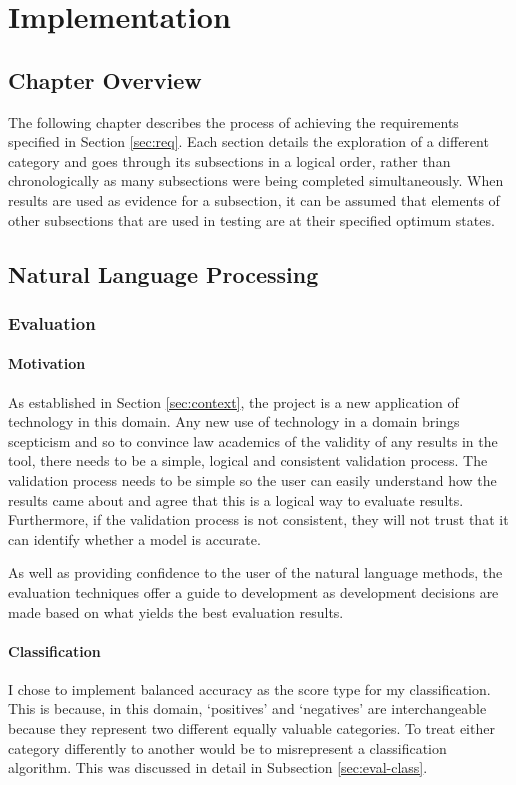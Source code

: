 \chapter{Implementation}
	\section{Chapter Overview}
		The following chapter describes the process of achieving the requirements specified in Section \ref{sec:req}. Each section details the exploration of a different category and goes through its subsections in a logical order, rather than chronologically as many subsections were being completed simultaneously. When results are used as evidence for a subsection, it can be assumed that elements of other subsections that are used in testing are at their specified optimum states. 
	\section{Natural Language Processing}
		\subsection{Evaluation}		
			\subsubsection{Motivation}
				As established in Section \ref{sec:context}, the project is a new application of technology in this domain. Any new use of technology in a domain brings scepticism and so to convince law academics of the validity of any results in the tool, there needs to be a simple, logical and consistent validation process. The validation process needs to be simple so the user can easily understand how the results came about and agree that this is a logical way to evaluate results. Furthermore, if the validation process is not consistent, they will not trust that it can identify whether a model is accurate. 
				
				As well as providing confidence to the user of the natural language methods, the evaluation techniques offer a guide to development as development decisions are made based on what yields the best evaluation results.
			\subsubsection{Classification}
				I chose to implement balanced accuracy as the score type for my classification. This is because, in this domain, `positives' and `negatives' are interchangeable because they represent two different equally valuable categories. To treat either category differently to another would be to misrepresent a classification algorithm. This was discussed in detail in Subsection \ref{sec:eval-class}. 
				
